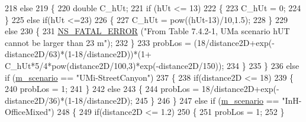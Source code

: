 \begin{DoxyCode}
218                                 \textcolor{keywordflow}{else}
219                                 \{
220                                         \textcolor{keywordtype}{double} C\_hUt;
221                                         \textcolor{keywordflow}{if} (hUt <= 13)
222                                         \{
223                                                 C\_hUt = 0;
224                                         \}
225                                         \textcolor{keywordflow}{else} \textcolor{keywordflow}{if}(hUt <=23)
226                                         \{
227                                                 C\_hUt = pow((hUt-13)/10,1.5);
228                                         \}
229                                         \textcolor{keywordflow}{else}
230                                         \{
231                                                 \hyperlink{group__fatal_ga5131d5e3f75d7d4cbfd706ac456fdc85}{NS\_FATAL\_ERROR} (\textcolor{stringliteral}{"From Table 7.4.2-1, UMa
       scenario hUT cannot be larger than 23 m"});
232                                         \}
233                                         probLos = (18/distance2D+exp(-distance2D/63)*(1-18/distance2D))*(1+
      C\_hUt*5/4*pow(distance2D/100,3)*exp(-distance2D/150));
234                                 \}
235                         \}
236                         \textcolor{keywordflow}{else} \textcolor{keywordflow}{if} (\hyperlink{classMmWave3gppPropagationLossModel_a3ba2b9e45f4d02e49620faf03f97e898}{m\_scenario} == \textcolor{stringliteral}{"UMi-StreetCanyon"})
237                         \{
238                                 \textcolor{keywordflow}{if}(distance2D <= 18)
239                                 \{
240                                         probLos = 1;
241                                 \}
242                                 \textcolor{keywordflow}{else}
243                                 \{
244                                         probLos = 18/distance2D+exp(-distance2D/36)*(1-18/distance2D);
245                                 \}
246                         \}
247                         \textcolor{keywordflow}{else} \textcolor{keywordflow}{if} (\hyperlink{classMmWave3gppPropagationLossModel_a3ba2b9e45f4d02e49620faf03f97e898}{m\_scenario} == \textcolor{stringliteral}{"InH-OfficeMixed"})
248                         \{
249                                 \textcolor{keywordflow}{if}(distance2D <= 1.2)
250                                 \{
251                                         probLos = 1;
252                                 \}

\end{DoxyCode}
